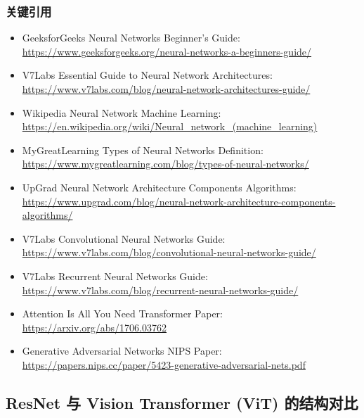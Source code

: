 \documentclass[UTF8]{report}
\theoremstyle{MyLineTheoremStyle} %
\theoremstyle{MyBlockTheoremStyle} %
\theoremstyle{MySubsubsectionStyle} %
\begin{document}
\subsubsection{关键引用}
\begin{itemize}
    \item GeeksforGeeks Neural Networks Beginner's Guide: \\
          \url{https://www.geeksforgeeks.org/neural-networks-a-beginners-guide/}
    \item V7Labs Essential Guide to Neural Network Architectures: \\
          \url{https://www.v7labs.com/blog/neural-network-architectures-guide/}
    \item Wikipedia Neural Network Machine Learning: \\
          \url{https://en.wikipedia.org/wiki/Neural_network_(machine_learning)}
    \item MyGreatLearning Types of Neural Networks Definition: \\
          \url{https://www.mygreatlearning.com/blog/types-of-neural-networks/}
    \item UpGrad Neural Network Architecture Components Algorithms: \\
          \url{https://www.upgrad.com/blog/neural-network-architecture-components-algorithms/}
    \item V7Labs Convolutional Neural Networks Guide: \\
          \url{https://www.v7labs.com/blog/convolutional-neural-networks-guide/}
    \item V7Labs Recurrent Neural Networks Guide: \\
          \url{https://www.v7labs.com/blog/recurrent-neural-networks-guide/}
    \item Attention Is All You Need Transformer Paper: \\
          \url{https://arxiv.org/abs/1706.03762}
    \item Generative Adversarial Networks NIPS Paper: \\
          \url{https://papers.nips.cc/paper/5423-generative-adversarial-nets.pdf}
\end{itemize}

\cleardoublepage

\subsection{ResNet 与 Vision Transformer (ViT) 的结构对比}
\end{document}
